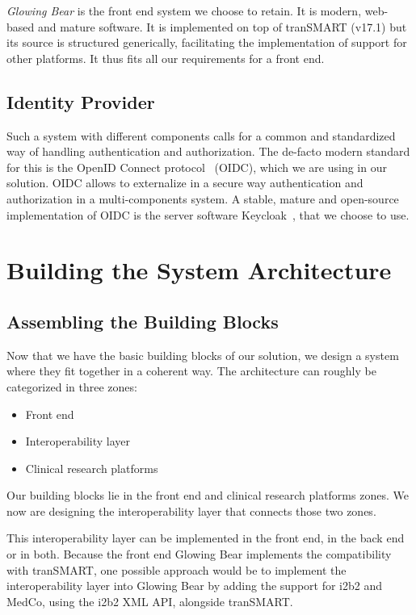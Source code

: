 \emph{Glowing Bear} is the front end system we choose to retain.
It is modern, web-based and mature software. 
It is implemented on top of tranSMART (v17.1) but its source is structured generically, facilitating the implementation of support for other platforms.
It thus fits all our requirements for a front end.


\subsection{Identity Provider}

Such a system with different components calls for a common and standardized way of handling authentication and authorization.
The de-facto modern standard for this is the OpenID Connect protocol~\cite{rfc:oidc} (OIDC), which we are using in our solution.
OIDC allows to externalize in a secure way authentication and authorization in a multi-components system.
A stable, mature and open-source implementation of OIDC is the server software Keycloak~\cite{keycloak}, that we choose to use.


\section{Building the System Architecture}

\subsection{Assembling the Building Blocks}

Now that we have the basic building blocks of our solution, we design a system where they fit together in a coherent way.
The architecture can roughly be categorized in three zones:
\begin{itemize}
    \item Front end
    \item Interoperability layer
    \item Clinical research platforms
\end{itemize}
Our building blocks lie in the front end and clinical research platforms zones. 
We now are designing the interoperability layer that connects those two zones.

This interoperability layer can be implemented in the front end, in the back end or in both.
Because the front end Glowing Bear implements the compatibility with tranSMART, one possible approach would be to implement the interoperability layer into Glowing Bear by adding the support for i2b2 and MedCo, using the i2b2 XML API, alongside tranSMART.

